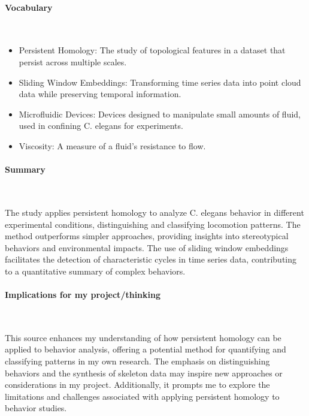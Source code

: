 \vspace{-0.5cm}
\paragraph{Vocabulary} \ 

\begin{itemize}
\item Persistent Homology: The study of topological features in a dataset that persist across multiple scales.
\item Sliding Window Embeddings: Transforming time series data into point cloud data while preserving temporal information.
\item Microfluidic Devices: Devices designed to manipulate small amounts of fluid, used in confining C. elegans for experiments.
\item Viscosity: A measure of a fluid's resistance to flow.
\end{itemize}

\vspace*{-0.5cm}
\paragraph{Summary} \

The study applies persistent homology to analyze C. elegans behavior in different experimental conditions, distinguishing and classifying locomotion patterns. The method outperforms simpler approaches, providing insights into stereotypical behaviors and environmental impacts. The use of sliding window embeddings facilitates the detection of characteristic cycles in time series data, contributing to a quantitative summary of complex behaviors. 

\vspace*{-0.5cm}
\paragraph{Implications for my project/thinking} \

This source enhances my understanding of how persistent homology can be applied to behavior analysis, offering a potential method for quantifying and classifying patterns in my own research. The emphasis on distinguishing behaviors and the synthesis of skeleton data may inspire new approaches or considerations in my project. Additionally, it prompts me to explore the limitations and challenges associated with applying persistent homology to behavior studies.

